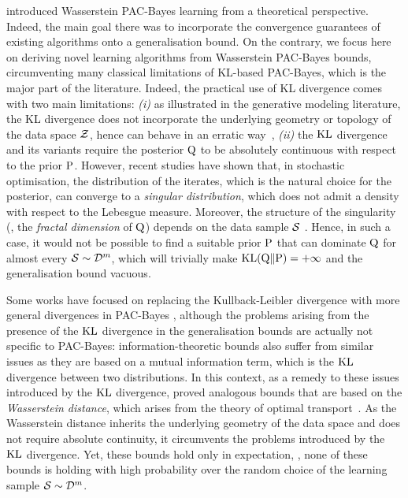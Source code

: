  introduced Wasserstein PAC-Bayes learning from a theoretical perspective. Indeed, the main goal there was to incorporate the convergence guarantees of existing algorithms onto a generalisation bound. On the contrary, we focus here on deriving novel learning algorithms from Wasserstein PAC-Bayes bounds, circumventing many classical limitations of KL-based PAC-Bayes, which is the major part of the literature. Indeed, the practical use of KL divergence comes with two main limitations: {\it (i)} as illustrated in the generative modeling literature, the KL divergence does not incorporate the underlying geometry or topology of the data space $\Z$, hence can behave in an erratic way~\citep{arjovsky2017wasserstein},
{\it (ii)} the $\KL$ divergence and its variants require the posterior $\Q$ to be absolutely continuous with respect to the prior $\P$.
However, recent studies \citep{camuto2021fractal} have shown that, in stochastic optimisation, the distribution of the iterates, which is the natural choice for the posterior, can converge to a \emph{singular distribution}, which does not admit a density with respect to the Lebesgue measure.
Moreover, the structure of the singularity (\ie, the \emph{fractal dimension} of $\Q$) depends on the data sample $\S$ \citep{camuto2021fractal}. 
Hence, in such a case, it would not be possible to find a suitable prior $\P$ that can dominate $\Q$ for almost every $\S \sim \D^m$, which will trivially make $\KL(\Q\|\P) = +\infty$ and the generalisation bound vacuous. 

Some works have focused on replacing the Kullback-Leibler divergence with more general divergences in PAC-Bayes \citep{alquier2018simpler,ohnishi2021novel,picard2022change}, although the problems arising from the presence of the $\KL$ divergence in the generalisation bounds are actually not specific to PAC-Bayes: information-theoretic bounds \citep{goyal2017pac,xu2017information,russo2020how} also suffer from similar issues as they are based on a mutual information term, which is the $\KL$ divergence between two distributions.
In this context, as a remedy to these issues introduced by the $\KL$ divergence, \cite{zhang2018optimal,wang2019information,rodriguez2021tighter,lugosi2022generalization} proved analogous bounds that are based on the \emph{Wasserstein distance}, which arises from the theory of optimal transport~\cite{monge1781memoire}.
As the Wasserstein distance inherits the underlying geometry of the data space and does not require absolute continuity, it circumvents the problems introduced by the $\KL$ divergence.
Yet, these bounds hold only in expectation, \ie, none of these bounds is holding with high probability over the random choice of the learning sample $\S\sim\D^{m}$.

